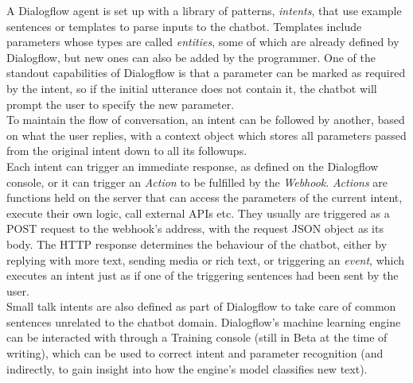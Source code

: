 A Dialogflow agent is set up with a library of patterns, \textit{intents}, that use example sentences or templates to parse inputs to the chatbot. Templates include parameters whose types are called \textit{entities}, some of which are already defined by Dialogflow, but new ones can also be added by the programmer. One of the standout capabilities of Dialogflow is that a parameter can be marked as required by the intent, so if the initial utterance does not contain it, the chatbot will prompt the user to specify the new parameter. \\
To maintain the flow of conversation, an intent can be followed by another, based on what the user replies, with a context object which stores all parameters passed from the original intent down to all its followups. \\
Each intent can trigger an immediate response, as defined on the Dialogflow console, or it can trigger an \textit{Action} to be fulfilled by the \textit{Webhook}. \textit{Actions} are functions held on the server that can access the parameters of the current intent, execute their own logic, call external APIs etc. They usually are triggered as a POST request to the webhook's address, with the request JSON object as its body. The HTTP response determines the behaviour of the chatbot, either by replying with more text, sending media or rich text, or triggering an \textit{event}, which executes an intent just as if one of the triggering sentences had been sent by the user. \\
Small talk intents are also defined as part of Dialogflow to take care of common sentences unrelated to the chatbot domain. Dialogflow's machine learning engine can be interacted with through a Training console (still in Beta at the time of writing), which can be used to correct intent and parameter recognition (and indirectly, to gain insight into how the engine's model classifies new text).

